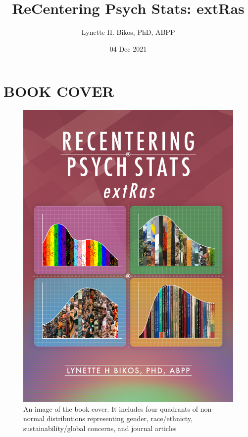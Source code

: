 \documentclass[
]{book}
\title{ReCentering Psych Stats: extRas}
\author{Lynette H. Bikos, PhD, ABPP}
\date{04 Dec 2021}
\begin{document}
\maketitle

{
\setcounter{tocdepth}{1}
\tableofcontents
}
\hypertarget{book-cover}{%
\chapter*{BOOK COVER}\label{book-cover}}

\begin{figure}
\centering
\includegraphics{images/ReCenterPsychStats-extRas-bookcover.png}
\caption{An image of the book cover. It includes four quadrants of non-normal distributions representing gender, race/ethnicty, sustainability/global concerns, and journal articles}
\end{figure}
\end{document}
